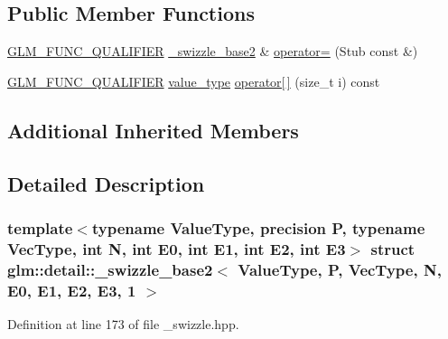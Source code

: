 \subsection*{Public Member Functions}
\begin{DoxyCompactItemize}
\item 
\hyperlink{setup_8hpp_a33fdea6f91c5f834105f7415e2a64407}{G\+L\+M\+\_\+\+F\+U\+N\+C\+\_\+\+Q\+U\+A\+L\+I\+F\+I\+ER} \hyperlink{structglm_1_1detail_1_1__swizzle__base2}{\+\_\+swizzle\+\_\+base2} \& \hyperlink{structglm_1_1detail_1_1__swizzle__base2_3_01_value_type_00_01_p_00_01_vec_type_00_01_n_00_01_e0_fc19218d69dc8988a4a57fbe7f79725c_aed2b7223090d020e28af46eb33fe6729}{operator=} (Stub const \&)
\item 
\hyperlink{setup_8hpp_a33fdea6f91c5f834105f7415e2a64407}{G\+L\+M\+\_\+\+F\+U\+N\+C\+\_\+\+Q\+U\+A\+L\+I\+F\+I\+ER} \hyperlink{structglm_1_1detail_1_1__swizzle__base2_3_01_value_type_00_01_p_00_01_vec_type_00_01_n_00_01_e0_fc19218d69dc8988a4a57fbe7f79725c_aea7ec681454787ad7a322c06aec98757}{value\+\_\+type} \hyperlink{structglm_1_1detail_1_1__swizzle__base2_3_01_value_type_00_01_p_00_01_vec_type_00_01_n_00_01_e0_fc19218d69dc8988a4a57fbe7f79725c_a6b72ddaed2713911d1cb17ebe14d481a}{operator\mbox{[}$\,$\mbox{]}} (size\+\_\+t i) const
\end{DoxyCompactItemize}
\subsection*{Additional Inherited Members}


\subsection{Detailed Description}
\subsubsection*{template$<$typename Value\+Type, precision P, typename Vec\+Type, int N, int E0, int E1, int E2, int E3$>$\newline
struct glm\+::detail\+::\+\_\+swizzle\+\_\+base2$<$ Value\+Type, P, Vec\+Type, N, E0, E1, E2, E3, 1 $>$}



Definition at line 173 of file \+\_\+swizzle.\+hpp.



